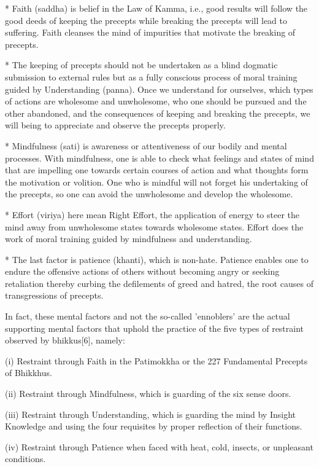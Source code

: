 * Faith (saddha) is belief in the Law of Kamma, i.e., good results will follow the good deeds of keeping the precepts while breaking the precepts will lead to suffering. Faith cleanses the mind of impurities that motivate the breaking of precepts.

* The keeping of precepts should not be undertaken as a blind dogmatic submission to external rules but as a fully conscious process of moral training guided by Understanding (panna). Once we understand for ourselves, which types of actions are wholesome and unwholesome, who one should be pursued and the other abandoned, and the consequences of keeping and breaking the precepts, we will being to appreciate and observe the precepts properly.

* Mindfulness (sati) is awareness or attentiveness of our bodily and mental processes. With mindfulness, one is able to check what feelings and states of mind that are impelling one towards certain courses of action and what thoughts form the motivation or volition. One who is mindful will not forget his undertaking of the precepts, so one can avoid the unwholesome and develop the wholesome.

* Effort (viriya) here mean Right Effort, the application of energy to steer the mind away from unwholesome states towards wholesome states. Effort does the work of moral training guided by mindfulness and understanding.

* The last factor is patience (khanti), which is non-hate. Patience enables one to endure the offensive actions of others without becoming angry or seeking retaliation thereby curbing the defilements of greed and hatred, the root causes of transgressions of precepts.

In fact, these mental factors and not the so-called 'ennoblers' are the actual supporting mental factors that uphold the practice of the five types of restraint observed by bhikkus[6], namely:

(i) Restraint through Faith in the Patimokkha or the 227 Fundamental Precepts of Bhikkhus.

(ii) Restraint through Mindfulness, which is guarding of the six sense doors.

(iii) Restraint through Understanding, which is guarding the mind by Insight Knowledge and using the four requisites by proper reflection of their functions.

(iv) Restraint through Patience when faced with heat, cold, insects, or unpleasant conditions.

